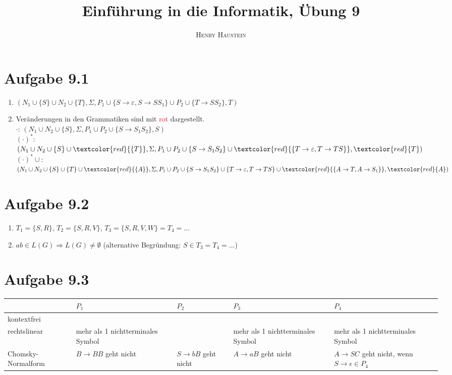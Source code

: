 \documentclass{article}
\title{\textbf{Einführung in die Informatik, Übung 9}}
\author{\textsc{Henry Haustein}}
\date{}
\begin{document}
	\maketitle
	
	\section*{Aufgabe 9.1}
	
	\begin{enumerate}[label=(\alph*)]
		\item $(N_1\cup \{S\}\cup N_2 \cup \{T\},\Sigma,P_1\cup \{S\to\varepsilon,S\to SS_1\}\cup P_2\cup \{T\to SS_2\},T)$
		\item Veränderungen in den Grammatiken sind mit \textcolor{red}{rot} dargestellt.\\
		$\cdot$: $(N_1\cup N_2\cup \{S\},\Sigma,P_1\cup P_2\cup \{S\to S_1S_2\},S)$ \\
		$(\cdot)^\ast$: $(N_1\cup N_2\cup \{S\}\cup \textcolor{red}{\{T\}},\Sigma,P_1\cup P_2\cup \{S\to S_1S_2\}\cup \textcolor{red}{\{T\to\varepsilon,T\to TS\}},\textcolor{red}{T})$ \\
		$(\cdot)^\ast\cup$: $(N_1\cup N_2\cup \{S\}\cup \{T\}\cup \textcolor{red}{\{A\}},\Sigma,P_1\cup P_2\cup \{S\to S_1S_2\}\cup \{T\to\varepsilon,T\to TS\}\cup \textcolor{red}{\{A\to T,A\to S_1\}},\textcolor{red}{A})$
	\end{enumerate}
	
	\section*{Aufgabe 9.2}
	
	\begin{enumerate}[label=(\alph*)]
		\item $T_1=\{S,R\}$, $T_2=\{S,R,V\}$, $T_3=\{S,R,V,W\}=T_4=...$
		\item $ab\in L(G)\Rightarrow L(G)\neq\emptyset$ (alternative Begründung: $S\in T_3=T_4=...$)
	\end{enumerate}

	\section*{Aufgabe 9.3}
	
	\begin{center}
		\begin{tabular}{l|L{3cm}|L{3cm}|L{3cm}|L{3cm}}
			& $P_1$ & $P_2$ & $P_3$ & $P_4$ \\
			\hline
			kontextfrei & \checkmark & \checkmark & \checkmark & \checkmark \\
			\hline
			rechtslinear & mehr als 1 nichtterminales Symbol & \checkmark & mehr als 1 nichtterminales Symbol & mehr als 1 nichtterminales Symbol \\
			\hline
			Chomsky-Normalform & $B\to BB$ geht nicht & $S\to bB$ geht nicht & $A\to aB$ geht nicht & $A\to SC$ geht nicht, wenn $S\to\epsilon\in P_4$
		\end{tabular}
	\end{center}
\end{document}
